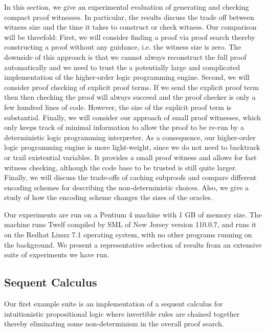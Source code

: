 \documentclass{llncs}
\begin{document}
In this section, we give an experimental evaluation of generating and checking 
compact proof witnesses. In particular, the results discuss the
trade off between witness size and the time it takes to construct or check
witness. Our comparison will be threefold: First, we will consider
finding a proof via proof search thereby constructing a proof without
any guidance, i.e. the witness size is zero. The downside of this approach is
that we cannot always reconstruct the full proof automatically and we
need to trust the a potentially large and complicated implementation
of the higher-order logic programming engine.  Second, we will
consider proof checking of explicit proof terms. If we send the
explicit proof term then then checking the proof will always succeed
and the proof checker is only a few hundred lines of code. However,
the size of the explicit proof term is substantial. Finally, we will
consider our approach of small proof witnesses, which only keeps track
of minimal information to allow the proof to be re-run by a
deterministic logic programming interpreter. As a consequence, 
our higher-order logic programming engine is more light-weight, since
we do not need to backtrack or trail existential variables. It
provides a small proof witness and allows for fast witness checking,
although the code base to be trusted is still quite larger.
Finally, we will discuss the trade-offs of caching subproofs and compare
different encoding schemes for describing the non-deterministic choices. 
Also, we give a study of how the encoding scheme changes the sizes of the 
oracles.

Our experiments are run on a Pentium 4 machine with 1 GB of memory size.
The machine runs Twelf compiled by SML of New Jersey version 110.0.7, and
runs it on the Redhat Linux 7.1 operating system, with no other programs
running on the background. We present a representative selection of results
from an extensive suite of experiments we have run.
   

\subsection{Sequent Calculus}
Our first example suite is an implementation of a sequent calculus 
for intuitionistic propositional logic where invertible rules are
chained together thereby eliminating some non-determinism in the
overall proof search. 
\end{document}

